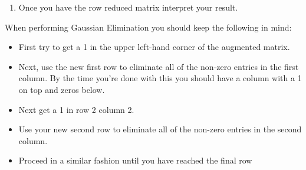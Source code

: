 \begin{problem}
\begin{enumerate}
{\[\begin{array}{ccc|c}
                        1 & -1 & -3 \end{array} \right)
                    \to \left( \begin{array}{ccc|c} 1 & 0 & 1 & 15 \\ 0 & 1 & 0 & 9 \\ 0 &
                        0 & -1 & -12 \end{array} \right)
                    \to \left( \begin{array}{ccc|c} 1 & 0 & 0 & 3 \\ 0 & 1 & 0 & 9 \\ 0 &
                        0 & 1 & 12 \end{array} \right)
                        \]
            }
        \item[(e)] Once you have the row reduced matrix interpret your result.
    \end{enumerate}
\end{problem}

\begin{technique}
    When performing Gaussian Elimination you should keep the following in mind:
    \begin{itemize}
        \item First try to get a 1 in the upper left-hand corner of the augmented matrix.
        \item Next, use the new first row to eliminate all of the non-zero entries in the first
            column. By the
            time you're done with this you should have a column with a 1 on top and zeros below.
        \item Next get a 1 in row 2 column 2.
        \item Use your new second row to eliminate all of the non-zero entries in the second
            column.
        \item Proceed in a similar fashion until you have reached the final row
    \end{itemize}
\end{technique}


